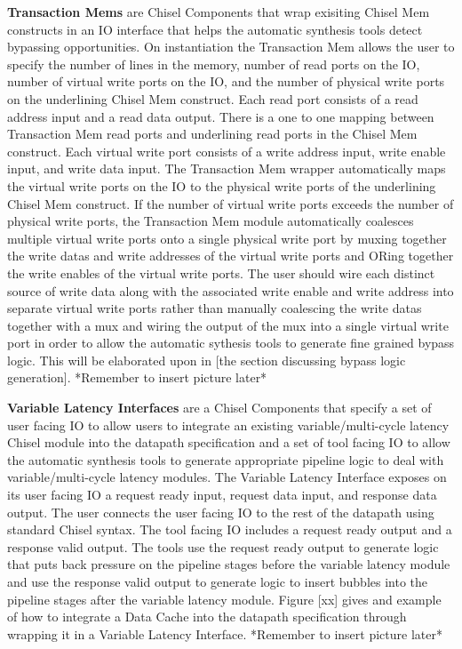 {\bf Transaction Mems} are Chisel Components that wrap exisiting Chisel Mem constructs in an IO interface that helps the automatic synthesis tools detect bypassing opportunities. On instantiation the Transaction Mem allows the user to specify the number of lines in the memory, number of read ports on the IO, number of virtual write ports on the IO, and the number of physical write ports on the underlining Chisel Mem construct. Each read port consists of a read address input and a read data output. There is a one to one mapping between Transaction Mem read ports and underlining read ports in the Chisel Mem construct. Each virtual write port consists of a write address input, write enable input, and write data input. The Transaction Mem wrapper automatically maps the virtual write ports on the IO to the physical write ports of the underlining Chisel Mem construct. If the number of virtual write ports exceeds the number of physical write ports, the Transaction Mem module automatically coalesces multiple virtual write ports onto a single physical write port by muxing together the write datas and write addresses of the virtual write ports and ORing together the write enables of the virtual write ports. The user should wire each distinct source of write data along with the associated write enable and write address into separate virtual write ports rather than manually coalescing the write datas together with a mux and wiring the output of the mux into a single virtual write port in order to allow the automatic sythesis tools to generate fine grained bypass logic. This will be elaborated upon in [the section discussing bypass logic generation]. *Remember to insert picture later* 

{\bf Variable Latency Interfaces} are a Chisel Components that specify a set of user facing IO to allow users to integrate an existing variable/multi-cycle latency Chisel module into the datapath specification and a set of tool facing IO to allow the automatic synthesis tools to generate appropriate pipeline logic to deal with variable/multi-cycle latency modules. The Variable Latency Interface exposes on its user facing IO a request ready input, request data input, and response data output. The user connects the user facing IO to the rest of the datapath using standard Chisel syntax. The tool facing IO includes a request ready output and a response valid output. The tools use the request ready output to generate logic that puts back pressure on the pipeline stages before the variable latency module and use the response valid output to generate logic to insert bubbles into the pipeline stages after the variable latency module. Figure [xx] gives and example of how to integrate a Data Cache into the datapath specification through wrapping it in a Variable Latency Interface. *Remember to insert picture later* 

